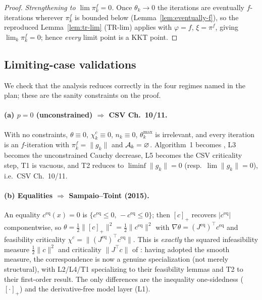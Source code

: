 \begin{proof}
  \emph{Strengthening to $\lim\pi_k^f=0$.} Once $\theta_k\to0$ the iterations are
  eventually $f$-iterations wherever $\pi_k^f$ is bounded below
  (Lemma~\ref{lem:eventually-f}), so the reproduced Lemma~\ref{lem:tr-lim} (TR-lim)
  applies with $\varphi=f$, $\xi=\pi^f$, giving $\lim_k\pi_k^f=0$; hence \emph{every}
  limit point is a KKT point.
\end{proof}

\subsection{Limiting-case validations}
\label{sec:limits}

We check that the analysis reduces correctly in the four regimes named in the
plan; these are the sanity constraints on the proof.

\paragraph{(a) $p=0$ (unconstrained) $\Rightarrow$ CSV Ch.~10/11.}
With no constraints, $\theta\equiv0$, $\chi_k^c\equiv0$, $n_k\equiv0$,
$\theta_k^{\max}$ is irrelevant, and every iteration is an $f$-iteration with
$\pi_k^f=\|g_k\|$ and $\mathcal{A}_k=\varnothing$. Algorithm~1 becomes
, L3 becomes the unconstrained Cauchy decrease, L5 becomes
the CSV criticality step, T1 is vacuous, and T2 reduces to
$\liminf\|g_k\|=0$ (resp.\ $\lim\|g_k\|=0$), i.e.\ CSV Ch.~10/11.

\paragraph{(b) Equalities $\Rightarrow$ Sampaio--Toint (2015).}
An equality $c^{\mathrm{eq}}(x)=0$ is $\{c^{\mathrm{eq}}\le0,\,-c^{\mathrm{eq}}\le0\}$;
then $[c]_+$ recovers $|c^{\mathrm{eq}}|$ componentwise, so
$\theta=\tfrac12\|[c]_+\|^2=\tfrac12\|c^{\mathrm{eq}}\|^2$ with
$\nabla\theta=(J^{\mathrm{eq}})^\top c^{\mathrm{eq}}$ and feasibility criticality
$\chi^c=\|(J^{\mathrm{eq}})^\top c^{\mathrm{eq}}\|$. This is \emph{exactly} the squared
infeasibility measure $\tfrac12\|c\|^2$ and criticality $\|J^\top c\|$ of
\citet{SampaioToint2015}: having adopted the smooth measure, the correspondence is now
a genuine specialization (not merely structural), with L2/L4/T1 specializing to their
feasibility lemmas and T2 to their first-order result. The only differences are the
inequality one-sidedness ($[\cdot]_+$) and the derivative-free model layer (L1).

